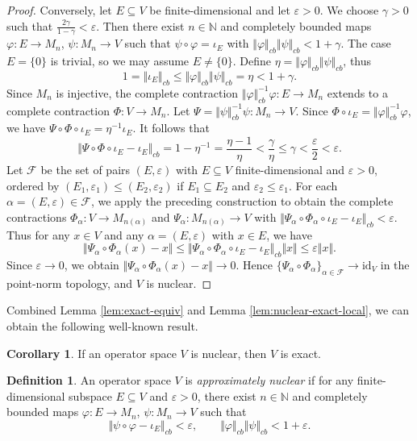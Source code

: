 \documentclass[12pt]{article}
\theoremstyle{definition}
\newtheorem{definition}[theorem]{Definition}
\newtheorem{corollary}[theorem]{Corollary}
\theoremstyle{remark}
\begin{document}
\begin{proof}
Conversely, let $E\subseteq V$ be finite-dimensional and let $\varepsilon>0$. We choose $\gamma>0$ such
that $\frac{2\gamma}{1-\gamma}<\varepsilon$. Then there exist $n\in\mathbb N$ and
completely bounded maps $\varphi:E\to M_n$, $\psi:M_n\to V$ such that
$\psi\circ\varphi=\iota_E$ with
$\Vert\varphi\Vert_{cb}\Vert\psi\Vert_{cb}<1+\gamma$.
The case $E=\{0\}$ is trivial, so we may assume $E\ne\{0\}$. Define $\eta=\Vert\varphi\Vert_{cb}\Vert\psi\Vert_{cb}$, thus
$$1=\Vert\iota_{E}\Vert_{cb}\leq\Vert\varphi\Vert_{cb}\Vert\psi\Vert_{cb}=\eta<1+\gamma.$$
 Since $M_{n}$ is injective, the complete contraction $\Vert\varphi\Vert_{cb}^{-1}\varphi:E\to M_n$ extends to a complete contraction $\Phi:V\to M_n$. Let $\Psi=\Vert\psi\Vert_{cb}^{-1}\psi: M_n\to V$.
Since $\Phi\circ\iota_E=\Vert\varphi\Vert_{cb}^{-1}\varphi$, we have $\Psi\circ\Phi\circ\iota_E=\eta^{-1}\iota_E$. It follows that
\[
\Vert \Psi\circ\Phi\circ\iota_E-\iota_E\Vert_{cb}
= 1-\eta^{-1}
=\frac{\eta-1}{\eta}
<\frac{\gamma}{\eta}
\le\gamma<\frac{\varepsilon}{2}<\varepsilon.
\]
Let $\mathcal{F}$ be the set of pairs $(E,\varepsilon)$ with $E\subseteq V$ finite-dimensional and $\varepsilon>0$, ordered by $(E_1,\varepsilon_1)\le(E_2,\varepsilon_2)$ if $E_1\subseteq E_2$ and $\varepsilon_2\le\varepsilon_1$.
For each $\alpha=(E,\varepsilon)\in\mathcal{F}$, we apply the preceding construction to obtain the complete contractions $\Phi_\alpha: V \to M_{n(\alpha)}$ and $\Psi_\alpha: M_{n(\alpha)} \to V$ with $\Vert \Psi_\alpha\circ\Phi_\alpha\circ\iota_E-\iota_E\Vert_{cb}<\varepsilon$.
Thus for any $x\in V$ and any $\alpha=(E,\varepsilon)$ with $x\in E$, we have
\[
\Vert \Psi_\alpha\circ\Phi_\alpha(x)-x\Vert\le\Vert \Psi_\alpha\circ\Phi_\alpha\circ\iota_E-\iota_E\Vert_{cb}\Vert x\Vert\le\varepsilon\Vert x\Vert.
\]
Since $\varepsilon\to 0$, we obtain $\Vert \Psi_\alpha\circ\Phi_\alpha(x)-x\Vert\to 0$.
Hence $\{\Psi_\alpha\circ\Phi_\alpha\}_{\alpha\in\mathcal{F}}\to\mathrm{id}_V$ in the point-norm topology, and $V$ is nuclear.
\end{proof}

Combined Lemma \ref{lem:exact-equiv} and Lemma \ref{lem:nuclear-exact-local}, we can obtain the following well-known result.
\begin{corollary}\label{cor:nuclear-exact}
If an operator space $V$ is nuclear, then $V$ is exact.
\end{corollary}

\begin{definition}\label{def:approx-nuclear}
An operator space $V$ is \emph{approximately nuclear} if for any
finite-dimensional subspace $E\subseteq V$ and $\varepsilon>0$,
there exist $n\in\mathbb N$ and completely bounded maps
$\varphi:E\to M_n$, $\psi:M_n\to V$ such that
\[
\Vert\psi\circ\varphi-\iota_E\Vert_{cb}<\varepsilon,\qquad
\Vert\varphi\Vert_{cb}\Vert\psi\Vert_{cb}<1+\varepsilon.
\]
\end{definition}
\end{document}
